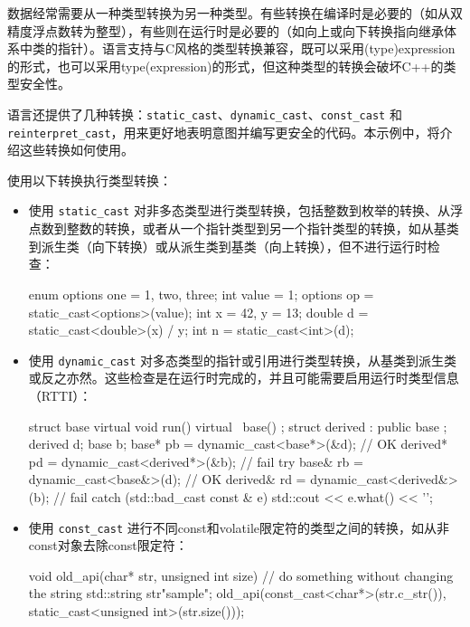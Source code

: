 
数据经常需要从一种类型转换为另一种类型。有些转换在编译时是必要的（如从双精度浮点数转为整型），有些则在运行时是必要的（如向上或向下转换指向继承体系中类的指针）。语言支持与C风格的类型转换兼容，既可以采用(type)expression的形式，也可以采用type(expression)的形式，但这种类型的转换会破坏C++的类型安全性。

语言还提供了几种转换：\verb|static_cast|、\verb|dynamic_cast|、\verb|const_cast| 和 \verb|reinterpret_cast|，用来更好地表明意图并编写更安全的代码。本示例中，将介绍这些转换如何使用。


使用以下转换执行类型转换：

\begin{itemize}
\item
使用 \verb|static_cast| 对非多态类型进行类型转换，包括整数到枚举的转换、从浮点数到整数的转换，或者从一个指针类型到另一个指针类型的转换，如从基类到派生类（向下转换）或从派生类到基类（向上转换），但不进行运行时检查：

\begin{cpp}
enum options {one = 1, two, three};
int value = 1;
options op = static_cast<options>(value);
int x = 42, y = 13;
double d = static_cast<double>(x) / y;
int n = static_cast<int>(d);
\end{cpp}

\item
使用 \verb|dynamic_cast| 对多态类型的指针或引用进行类型转换，从基类到派生类或反之亦然。这些检查是在运行时完成的，并且可能需要启用运行时类型信息（RTTI）：

\begin{cpp}
struct base
{
    virtual void run() {}
    virtual ~base() {}
};
struct derived : public base
{
};
derived d;
base b;
base* pb = dynamic_cast<base*>(&d);         // OK
derived* pd = dynamic_cast<derived*>(&b);   // fail
try
{
    base& rb = dynamic_cast<base&>(d);       // OK
    derived& rd = dynamic_cast<derived&>(b); // fail
}
catch (std::bad_cast const & e)
{
    std::cout << e.what() << '\n';
}
\end{cpp}

\item
使用 \verb|const_cast| 进行不同const和volatile限定符的类型之间的转换，如从非const对象去除const限定符：

\begin{cpp}
void old_api(char* str, unsigned int size)
{
    // do something without changing the string
}
std::string str{"sample"};
old_api(const_cast<char*>(str.c_str()),
        static_cast<unsigned int>(str.size()));
\end{cpp}


\end{itemize}
